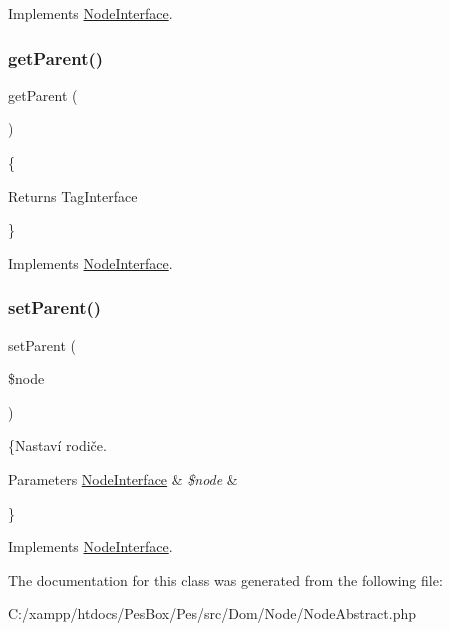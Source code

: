 Implements \mbox{\hyperlink{interface_pes_1_1_dom_1_1_node_1_1_node_interface_a3d0963e68bb313b163a73f2803c64600}{Node\+Interface}}.

\mbox{\label{class_pes_1_1_dom_1_1_node_1_1_node_abstract_a95ecaee3537b1ad29b04ef383a57bbae}} 
\subsubsection{\texorpdfstring{get\+Parent()}{getParent()}}
{\footnotesize\ttfamily get\+Parent (\begin{DoxyParamCaption}{ }\end{DoxyParamCaption})}

\{\begin{DoxyReturn}{Returns}
Tag\+Interface
\end{DoxyReturn}
\} 

Implements \mbox{\hyperlink{interface_pes_1_1_dom_1_1_node_1_1_node_interface_a95ecaee3537b1ad29b04ef383a57bbae}{Node\+Interface}}.

\mbox{\label{class_pes_1_1_dom_1_1_node_1_1_node_abstract_a3eb7b224ac469e505363e30fd18d3dbb}} 
\subsubsection{\texorpdfstring{set\+Parent()}{setParent()}}
{\footnotesize\ttfamily set\+Parent (\begin{DoxyParamCaption}\item[{\mbox{\hyperlink{interface_pes_1_1_dom_1_1_node_1_1_node_interface}{Node\+Interface}}}]{\$node }\end{DoxyParamCaption})}

\{Nastaví rodiče. 
\begin{DoxyParams}[1]{Parameters}
\mbox{\hyperlink{interface_pes_1_1_dom_1_1_node_1_1_node_interface}{Node\+Interface}} & {\em \$node} & \\
\hline
\end{DoxyParams}
\} 

Implements \mbox{\hyperlink{interface_pes_1_1_dom_1_1_node_1_1_node_interface_a3eb7b224ac469e505363e30fd18d3dbb}{Node\+Interface}}.



The documentation for this class was generated from the following file\+:\begin{DoxyCompactItemize}
\item 
C\+:/xampp/htdocs/\+Pes\+Box/\+Pes/src/\+Dom/\+Node/Node\+Abstract.\+php\end{DoxyCompactItemize}
